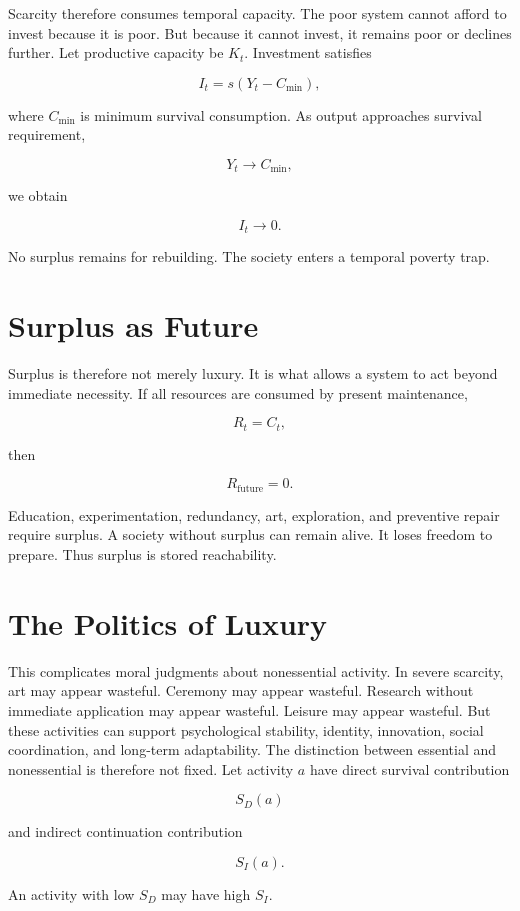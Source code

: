 \documentclass[11pt,oneside]{book}
\theoremstyle{definition}
\theoremstyle{remark}
\begin{document}
Scarcity therefore consumes temporal capacity. The poor system cannot afford to invest because it is
poor. But because it cannot invest, it remains poor or declines further. Let productive capacity be
\(K_t\). Investment satisfies

\[
I_t = s(Y_t-C_{\min}),
\]

where \(C_{\min}\) is minimum survival consumption. As output approaches survival requirement,

\[
Y_t\rightarrow C_{\min},
\]

we obtain

\[
I_t\rightarrow0.
\]

No surplus remains for rebuilding. The society enters a temporal poverty trap.

\section{Surplus as Future}

Surplus is therefore not merely luxury. It is what allows a system to act beyond immediate
necessity. If all resources are consumed by present maintenance,

\[
R_t=C_t,
\]

then

\[
R_{\mathrm{future}}=0.
\]

Education, experimentation, redundancy, art, exploration, and preventive repair require surplus. A
society without surplus can remain alive. It loses freedom to prepare. Thus surplus is stored
reachability.

\section{The Politics of Luxury}

This complicates moral judgments about nonessential activity. In severe scarcity, art may appear
wasteful. Ceremony may appear wasteful. Research without immediate application may appear wasteful.
Leisure may appear wasteful. But these activities can support psychological stability, identity,
innovation, social coordination, and long-term adaptability. The distinction between essential and
nonessential is therefore not fixed. Let activity \(a\) have direct survival contribution

\[
S_D(a)
\]

and indirect continuation contribution

\[
S_I(a).
\]

An activity with low \(S_D\) may have high \(S_I\).
\end{document}
